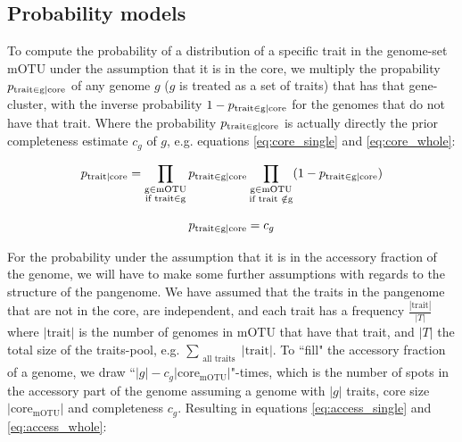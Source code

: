 \documentclass{article}
\begin{document}
\subsection*{Probability models}

To compute the probability of a distribution of a specific trait in the genome-set $\textrm{{mOTU}}$ under the assumption that it is in the core, we multiply the propability $p_{\textrm{trait} \in \textrm{g\textbar core}}$ of any genome $g$ ($g$ is treated as a set of traits) that has that gene-cluster, with the inverse probability $1-p_{\textrm{trait} \in \textrm{g\textbar core}}$ for the genomes that do not have that trait. Where the probability $p_{\textrm{trait} \in \textrm{g\textbar core}}$ is actually directly the prior completeness estimate $c_g$ of $g$, e.g. equations \ref{eq:core_single} and \ref{eq:core_whole}:

\begin{equation} \label{eq:core_single}
p_{\textrm{trait\textbar core}}=\prod_{\substack{\textrm{g} \in \textrm{mOTU}\\ \textrm{if trait} \in \textrm{g}}} p_{\textrm{trait} \in \textrm{g\textbar core}} \prod_{\substack{\textrm{g} \in \textrm{mOTU}\\ \textrm{if trait } \notin \textrm{g}}}(1-p_{\textrm{trait} \in \textrm{g\textbar core}})
\end{equation}

\begin{equation} \label{eq:core_whole}
p_{\textrm{trait} \in \textrm{g\textbar core}}=c_g
\end{equation}

For the probability under the assumption that it is in the accessory fraction of the genome, we will have to make some further assumptions with regards to the structure of the pangenome. We have assumed that the traits in the pangenome that are not in the core, are independent, and each trait has a frequency $\frac{|\textrm{trait}|}{|T|}$ where $|\textrm{trait}|$ is the number of genomes in $\textrm{mOTU}$ that have that trait, and $|T|$ the total size of the traits-pool, e.g. $\sum_{\substack{\textrm{all traits}}}{|\textrm{trait}|}$. To ``fill" the accessory fraction of a genome, we draw ``$|g|-c_g|\textrm{core}_{\textrm{mOTU}}|$"-times, which is the number of spots in the accessory part of the genome assuming a genome with $|g|$ traits, core size $|\textrm{core}_\textrm{mOTU}|$ and completeness $c_g$. Resulting in equations \ref{eq:access_single} and \ref{eq:access_whole}:
\end{document}
